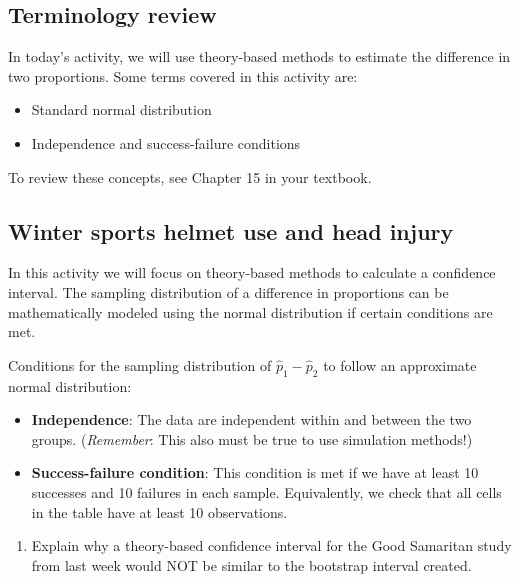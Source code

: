 \documentclass[
]{report}
\providecommand{\tightlist}{%
  \setlength{\itemsep}{0pt}\setlength{\parskip}{0pt}}
\begin{document}
\hypertarget{terminology-review-15}{%
\subsection{Terminology review}\label{terminology-review-15}}

In today's activity, we will use theory-based methods to estimate the difference in two proportions. Some terms covered in this activity are:

\begin{itemize}
\item
  Standard normal distribution
\item
  Independence and success-failure conditions
\end{itemize}

To review these concepts, see Chapter 15 in your textbook.

\hypertarget{winter-sports-helmet-use-and-head-injury}{%
\subsection{Winter sports helmet use and head injury}\label{winter-sports-helmet-use-and-head-injury}}

In this activity we will focus on theory-based methods to calculate a confidence interval. The sampling distribution of a difference in proportions can be mathematically modeled using the normal distribution if certain conditions are met.

Conditions for the sampling distribution of \(\hat{p}_1-\hat{p}_2\) to follow an approximate normal distribution:

\begin{itemize}
\item
  \textbf{Independence}: The data are independent within and between the two groups. (\emph{Remember}: This also must be true to use simulation methods!)
\item
  \textbf{Success-failure condition}: This condition is met if we have at least 10 successes and 10 failures in each sample. Equivalently, we check that all cells in the table have at least 10 observations.
\end{itemize}

\begin{enumerate}
\def\labelenumi{\arabic{enumi}.}
\tightlist
\item
  Explain why a theory-based confidence interval for the Good Samaritan study from last week would NOT be similar to the bootstrap interval created.
\end{enumerate}
\end{document}
